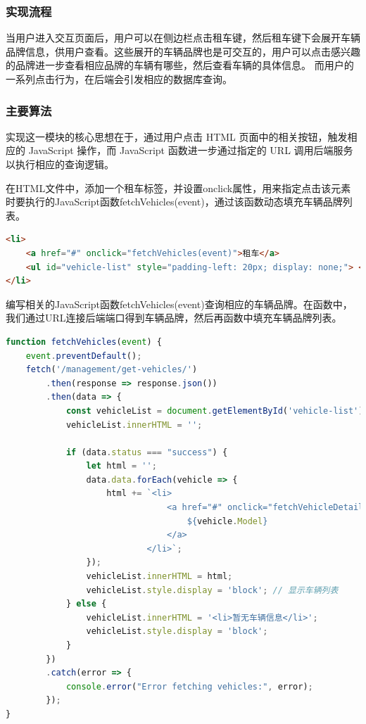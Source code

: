 \documentclass[UTF8,a4paper,12pt]{ctexart}
\begin{document}
\subsubsection{实现流程}
当用户进入交互页面后，用户可以在侧边栏点击租车键，然后租车键下会展开车辆品牌信息，供用户查看。这些展开的车辆品牌也是可交互的，用户可以点击感兴趣的品牌进一步查看相应品牌的车辆有哪些，然后查看车辆的具体信息。
而用户的一系列点击行为，在后端会引发相应的数据库查询。

\subsubsection{主要算法}
实现这一模块的核心思想在于，通过用户点击 HTML 页面中的相关按钮，触发相应的 JavaScript 操作，而 JavaScript 函数进一步通过指定的 URL 调用后端服务以执行相应的查询逻辑。

在HTML文件中，添加一个租车标签，并设置onclick属性，用来指定点击该元素时要执行的JavaScript函数fetchVehicles(event)，通过该函数动态填充车辆品牌列表。
\begin{lstlisting}[language=HTML]
<li>
    <a href="#" onclick="fetchVehicles(event)">租车</a>
    <ul id="vehicle-list" style="padding-left: 20px; display: none;"> </ul>
</li>
\end{lstlisting}

编写相关的JavaScript函数fetchVehicles(event)查询相应的车辆品牌。在函数中，我们通过URL连接后端端口得到车辆品牌，然后再函数中填充车辆品牌列表。
\begin{lstlisting}[language=JavaScript]
function fetchVehicles(event) {
    event.preventDefault();
    fetch('/management/get-vehicles/')
        .then(response => response.json())
        .then(data => {
            const vehicleList = document.getElementById('vehicle-list');
            vehicleList.innerHTML = ''; 

            if (data.status === "success") {
                let html = '';
                data.data.forEach(vehicle => {
                    html += `<li>
                                <a href="#" onclick="fetchVehicleDetails('${vehicle.Model}')">
                                    ${vehicle.Model}
                                </a>
                            </li>`;
                });
                vehicleList.innerHTML = html;
                vehicleList.style.display = 'block'; // 显示车辆列表
            } else {
                vehicleList.innerHTML = '<li>暂无车辆信息</li>';
                vehicleList.style.display = 'block';
            }
        })
        .catch(error => {
            console.error("Error fetching vehicles:", error);
        });
}
\end{lstlisting}
\end{document}
